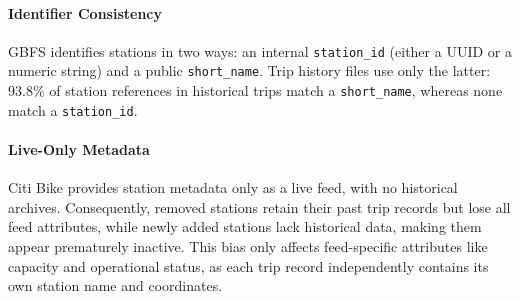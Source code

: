 \paragraph{Identifier Consistency}
GBFS identifies stations in two ways: an internal \texttt{station\_id} (either a UUID or a numeric string) and a public \texttt{short\_name}.
Trip history files use only the latter: $93.8\%$ of station references in historical trips match a \texttt{short\_name}, whereas none match a \texttt{station\_id}.

\paragraph{Live-Only Metadata}
Citi Bike provides station metadata only as a live feed, with no historical archives.
Consequently, removed stations retain their past trip records but lose all feed attributes, while newly added stations lack historical data, making them appear prematurely inactive.
This bias only affects feed-specific attributes like capacity and operational status, as each trip record independently contains its own station name and coordinates.
